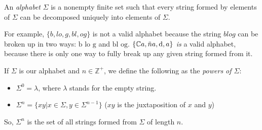 \documentclass{article}
\begin{document}
An \emph{alphabet} $\Sigma$ is a nonempty finite set such that every string formed by elements of $\Sigma$ can be decomposed uniquely into elements of $\Sigma$.

For example, $\{b,lo,g,bl,og\}$
is not a valid alphabet because the string $blog$ can be broken up in two ways: $\mbox{b lo g}$ and $\mbox{bl og}$.
$\{\mathbb{C}a,\ddot{n}a,{\rm d},a\}$ \emph{is} a valid alphabet, because there
is only one way to fully break up any given string formed from it.

If $\Sigma$ is our alphabet and $n \in \mathbb{Z}^+$,
we define the following as the \emph{powers of $\Sigma$}:
\begin{itemize}
\item $\Sigma^0 = {\lambda }$, where $\lambda$ stands for the empty string.
\item $\Sigma^n = \{xy|x \in \Sigma, y \in \Sigma^{n-1}\}$ ($xy$ is the juxtaposition of $x$ and $y$)
\end{itemize}

So, $\Sigma^n$ is the set of all strings formed from $\Sigma$ of length $n$.
\end{document}
